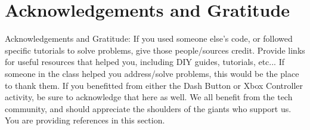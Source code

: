 \documentclass[12pt,a4paper]{article}
\begin{document}
\section{Acknowledgements and Gratitude}

Acknowledgements and Gratitude: If you used someone else's code, or followed specific tutorials to solve problems, give those people/sources credit.  Provide links for useful resources that helped you, including DIY guides, tutorials, etc...  If someone in the class helped you address/solve problems, this would be the place to thank them.  If you benefitted from either the Dash Button or Xbox Controller activity, be sure to acknowledge that here as well.  We all benefit from the tech community, and should appreciate the shoulders of the giants who support us.  You are providing references in this section.





\end{document}
